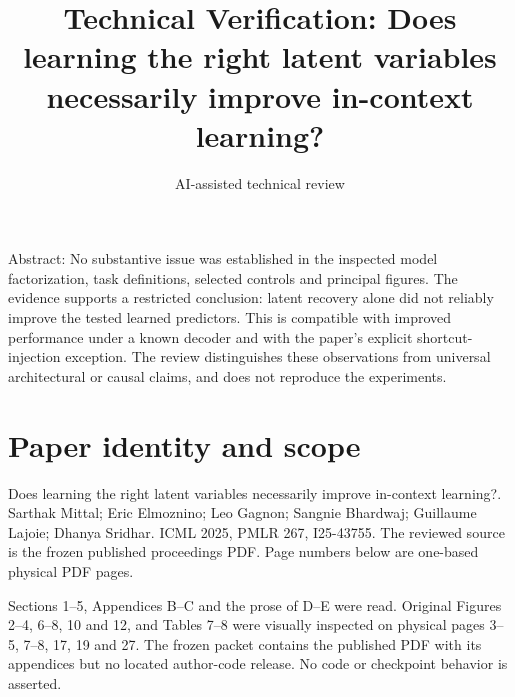 \documentclass[10pt]{article}
\title{Technical Verification: Does learning the right latent variables necessarily improve in-context learning?}
\author{AI-assisted technical review}
\date{}
\begin{document}
\maketitle
Abstract: No substantive issue was established in the inspected model factorization, task definitions, selected controls and principal figures. The evidence supports a restricted conclusion: latent recovery alone did not reliably improve the tested learned predictors. This is compatible with improved performance under a known decoder and with the paper’s explicit shortcut-injection exception. The review distinguishes these observations from universal architectural or causal claims, and does not reproduce the experiments.\par
\section*{Paper identity and scope}
Does learning the right latent variables necessarily improve in-context learning?. Sarthak Mittal; Eric Elmoznino; Leo Gagnon; Sangnie Bhardwaj; Guillaume Lajoie; Dhanya Sridhar. ICML 2025, PMLR 267, I25-43755. The reviewed source is the frozen published proceedings PDF. Page numbers below are one-based physical PDF pages.\par
Sections 1–5, Appendices B–C and the prose of D–E were read. Original Figures 2–4, 6–8, 10 and 12, and Tables 7–8 were visually inspected on physical pages 3–5, 7–8, 17, 19 and 27. The frozen packet contains the published PDF with its appendices but no located author-code release. No code or checkpoint behavior is asserted.\par
\end{document}
